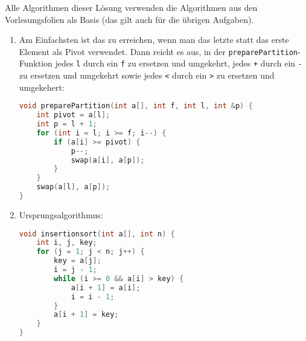 \documentclass[11pt,a4paper]{article}
\begin{document}
\begin{loesung}
    Alle Algorithmen dieser Lösung verwenden die Algorithmen aus den Vorlesungsfolien als Basis (das gilt auch für die übrigen Aufgaben).
    \begin{enumerate}
        \item
        Am Einfachsten ist das zu erreichen, wenn man das letzte statt das erste Element als Pivot verwendet. Dann reicht es aus, in der \texttt{preparePartition}-Funktion jedes \texttt{l} durch ein \texttt{f} zu ersetzen und umgekehrt, jedes \texttt{+} durch ein \texttt{-} zu ersetzen und umgekehrt sowie jedes \texttt{<} durch ein \texttt{>} zu ersetzen und umgekehert:
        \begin{lstlisting}[language=c++]
void preparePartition(int a[], int f, int l, int &p) {
    int pivot = a[l];
    int p = l + 1;
    for (int i = l; i >= f; i--) {
        if (a[i] >= pivot) {
            p--;
            swap(a[i], a[p]);
        }
    }
    swap(a[l], a[p]);
}
        \end{lstlisting}

        \item Ursprungsalgorithmus:
        \begin{lstlisting}[language=c++]
void insertionsort(int a[], int n) {
    int i, j, key;
    for (j = 1; j < n; j++) {
        key = a[j];
        i = j - 1;
        while (i >= 0 && a[i] > key) {
            a[i + 1] = a[i];
            i = i - 1;
        }
        a[i + 1] = key;
    }
} 
        \end{lstlisting}
        

\end{enumerate}
\end{loesung}
\end{document}
